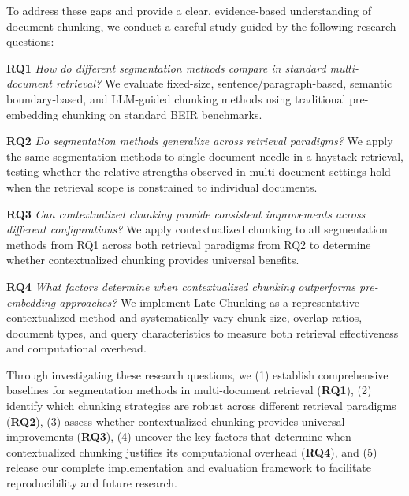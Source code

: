 To address these gaps and provide a clear, evidence-based understanding of document chunking, we conduct a careful study guided by the following research questions:

\textbf{RQ1} \textit{How do different segmentation methods compare in standard multi-document retrieval?} We evaluate fixed-size, sentence/paragraph-based, semantic boundary-based, and LLM-guided chunking methods using traditional pre-embedding chunking on standard BEIR benchmarks.

\textbf{RQ2} \textit{Do segmentation methods generalize across retrieval paradigms?} We apply the same segmentation methods to single-document needle-in-a-haystack retrieval, testing whether the relative strengths observed in multi-document settings hold when the retrieval scope is constrained to individual documents.

\textbf{RQ3} \textit{Can contextualized chunking provide consistent improvements across different configurations?} We apply contextualized chunking to all segmentation methods from RQ1 across both retrieval paradigms from RQ2 to determine whether contextualized chunking provides universal benefits.

\textbf{RQ4} \textit{What factors determine when contextualized chunking outperforms pre-embedding approaches?} We implement Late Chunking as a representative contextualized method and systematically vary chunk size, overlap ratios, document types, and query characteristics to measure both retrieval effectiveness and computational overhead.

Through investigating these research questions, we (1) establish comprehensive baselines for segmentation methods in multi-document retrieval (\textbf{RQ1}), (2) identify which chunking strategies are robust across different retrieval paradigms (\textbf{RQ2}), (3) assess whether contextualized chunking provides universal improvements (\textbf{RQ3}), (4) uncover the key factors that determine when contextualized chunking justifies its computational overhead (\textbf{RQ4}), and (5) release our complete implementation and evaluation framework to facilitate reproducibility and future research.
